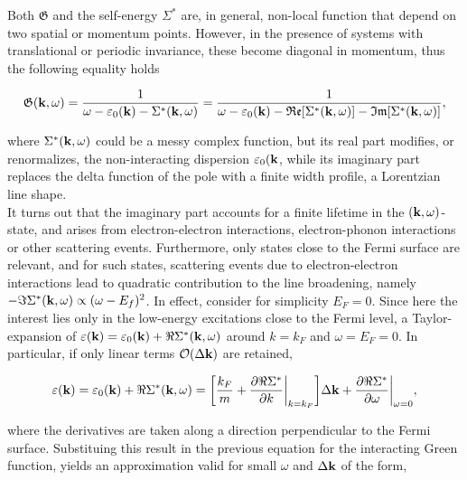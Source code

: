 Both $\mathfrak{G}$ and the self-energy $\Sigma^*$ are, in general, non-local function that depend on two spatial or momentum points. However, in the presence of systems with translational or periodic invariance, these become diagonal in momentum, thus the following equality holds 

\begin{equation}
    \mathfrak{G}({\bf k}, \omega) = \frac{1}{\omega - \varepsilon_0({\bf k}) - \Sigma^*({\bf k}, \omega)} = \frac{1}{\omega - \varepsilon_0({\bf k}) - \mathfrak{R}\mathfrak{e}[\Sigma^*({\bf k}, \omega)]- \mathfrak{I}\mathfrak{m}[\Sigma^*({\bf k}, \omega)]},
\end{equation}

where $\Sigma^*({\bf k}, \omega)$ could be a messy complex function, but its real part modifies, or renormalizes, the non-interacting dispersion $\varepsilon_0({\bf k}$, while its imaginary part replaces the delta function of the pole with a finite width profile, a Lorentzian line shape. \\

It turns out that the imaginary part accounts for a finite lifetime in the $({\bf k}, \omega)$-state, and arises from electron-electron interactions, electron-phonon interactions or other scattering events. Furthermore, only states close to the Fermi surface are relevant, and for such states, scattering events due to electron-electron interactions lead to quadratic contribution to the line broadening, namely $-\Im \Sigma^*({\bf k}, \omega) \propto (\omega - E_f)^2$. In effect, consider for simplicity $E_F = 0$. Since here the interest lies only in the low-energy excitations close to the Fermi level, a Taylor-expansion of $\varepsilon({\bf k}) = \varepsilon_{0}({\bf k}) + \Re \Sigma^*({\bf k}, \omega)$ around $k = k_F$ and $\omega = E_F = 0$. In particular, if only linear terms $\mathcal{O}(\Delta {\bf k})$ are retained,

\begin{equation}
    \varepsilon({\bf k}) = \varepsilon_{0}({\bf k}) + \Re \Sigma^*({\bf k}, \omega) = \bigg[\frac{k_F}{m} + \frac{\partial \Re \Sigma^*}{\partial k}\bigg|_{k=k_F}\bigg] \Delta {\bf k} + \frac{\partial \Re \Sigma^*}{\partial \omega}\bigg|_{\omega = 0},
\end{equation}

where the derivatives are taken along a direction perpendicular to the Fermi surface. Substituing this result in the previous equation for the interacting Green function, yields an approximation valid for small $\omega$ and $\Delta {\bf k}$ of the form,

